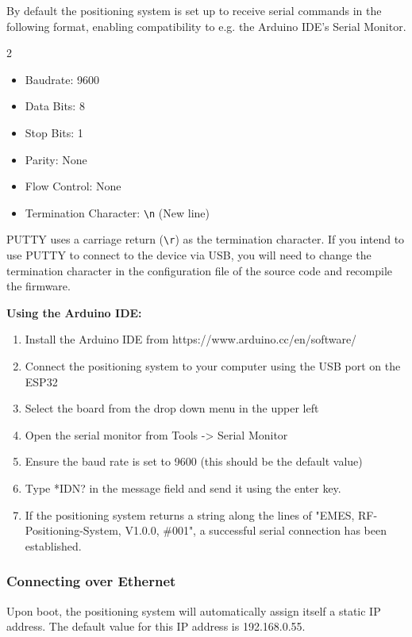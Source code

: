 By default the positioning system is set up to receive serial commands in the following format, enabling compatibility to e.g. the Arduino IDE's Serial Monitor.
\begin{multicols}{2}
\begin{itemize}
    \itemsep0em 
    \item Baudrate: 9600
    \item Data Bits: 8
    \item Stop Bits: 1
    \item Parity: None
    \item Flow Control: None
    \item Termination Character: \texttt{\textbackslash n} (New line)
\end{itemize}
\end{multicols}

\begin{warningbox}
    PUTTY uses a carriage return (\texttt{\textbackslash r}) as the termination character. If you intend to use PUTTY to connect to the device via USB, you will need to change the termination character in the configuration file of the source code and recompile the firmware.
\end{warningbox}

\textbf{Using the Arduino IDE:}

\begin{enumerate}
    \item Install the Arduino IDE from https://www.arduino.cc/en/software/
    \item Connect the positioning system to your computer using the USB port on the ESP32
    \item Select the board from the drop down menu in the upper left 
    \item Open the serial monitor from Tools -> Serial Monitor
    \item Ensure the baud rate is set to 9600 (this should be the default value)
    \item Type *IDN? in the message field and send it using the enter key.
    \item If the positioning system returns a string along the lines of "EMES, RF-Positioning-System, V1.0.0, \#001", a successful serial connection has been established.
\end{enumerate}

\subsubsection{Connecting over Ethernet}
Upon boot, the positioning system will automatically assign itself a static IP address. The default value for this IP address is 192.168.0.55.

